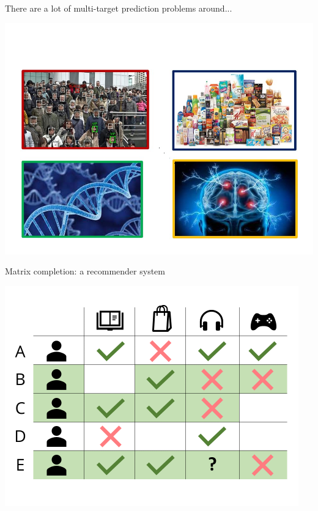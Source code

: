 \documentclass[]{beamer}
\begin{document}
\begin{frame}{There are a lot of multi-target prediction problems around...}

\begin{center}
\includegraphics[width=\textwidth,trim = 0 0 0 70,clip]{Figures/pictures/Slide25}
\end{center}

\end{frame}

\begin{frame}{Matrix completion: a recommender system}

\begin{center}
\includegraphics[scale=0.5]{Figures/collafilt}
\end{center}

\end{frame}
\end{document}
